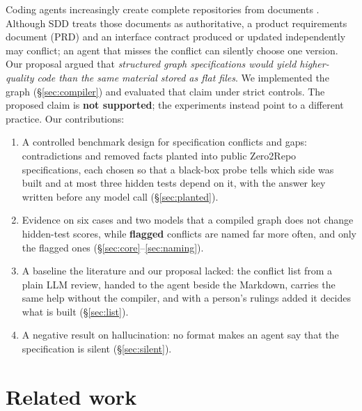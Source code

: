 \documentclass{article}
\begin{document}
Coding agents increasingly create complete repositories from documents
\citep{chen2026repo0,peng2026repogenesis,yang2026zero2repo}. Although SDD treats those documents as authoritative, a product requirements document (PRD) and an interface contract produced or updated independently may conflict; an agent that misses the conflict can silently choose one version. Our proposal argued that \emph{structured graph specifications would yield higher-quality code than the same material stored as flat files}. We implemented the graph (\S\ref{sec:compiler}) and evaluated that claim under strict controls. The proposed claim is \textbf{not supported}; the experiments instead point to a different practice. Our contributions:
\begin{enumerate}
  \item A controlled benchmark design for specification conflicts and gaps: contradictions and removed
  facts planted into public Zero2Repo specifications, each chosen so that a black-box probe tells which
  side was built and at most three hidden tests depend on it, with the answer key written before any
  model call (\S\ref{sec:planted}).
  \item Evidence on six cases and two models that a compiled graph does not change hidden-test scores,
  while \textbf{flagged} conflicts are named far more often, and only the flagged ones
  (\S\ref{sec:core}--\ref{sec:naming}).
  \item A baseline the literature and our proposal lacked: the conflict list from a plain LLM review,
  handed to the agent beside the Markdown, carries the same help without the compiler, and with a
  person's rulings added it decides what is built (\S\ref{sec:list}).
  \item A negative result on hallucination: no format makes an agent say that the specification is silent
  (\S\ref{sec:silent}).
\end{enumerate}

\section{Related work}
\end{document}
